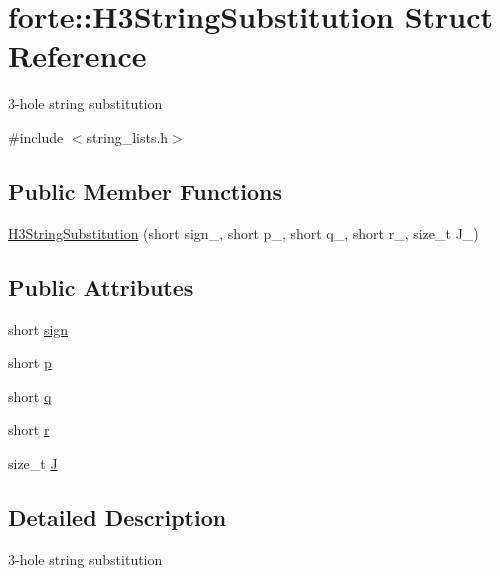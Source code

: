 \hypertarget{structforte_1_1_h3_string_substitution}{}\section{forte\+:\+:H3\+String\+Substitution Struct Reference}
\label{structforte_1_1_h3_string_substitution}


3-\/hole string substitution  




{\ttfamily \#include $<$string\+\_\+lists.\+h$>$}

\subsection*{Public Member Functions}
\begin{DoxyCompactItemize}
\item 
\mbox{\hyperlink{structforte_1_1_h3_string_substitution_a60e7f048356af68196c146d6f8b87133}{H3\+String\+Substitution}} (short sign\+\_\+, short p\+\_\+, short q\+\_\+, short r\+\_\+, size\+\_\+t J\+\_\+)
\end{DoxyCompactItemize}
\subsection*{Public Attributes}
\begin{DoxyCompactItemize}
\item 
short \mbox{\hyperlink{structforte_1_1_h3_string_substitution_a90b20ba96e418b0c058d3dba0065b9c0}{sign}}
\item 
short \mbox{\hyperlink{structforte_1_1_h3_string_substitution_aa123b1f94832a7e0b813b9023eb282fd}{p}}
\item 
short \mbox{\hyperlink{structforte_1_1_h3_string_substitution_adb25f68e2cb0afca4950ecc7f0822608}{q}}
\item 
short \mbox{\hyperlink{structforte_1_1_h3_string_substitution_ab4704f4e2426f29fd3b087a97016d6bd}{r}}
\item 
size\+\_\+t \mbox{\hyperlink{structforte_1_1_h3_string_substitution_a7f7b61d7d0dba1512d5826f586575327}{J}}
\end{DoxyCompactItemize}


\subsection{Detailed Description}
3-\/hole string substitution 

